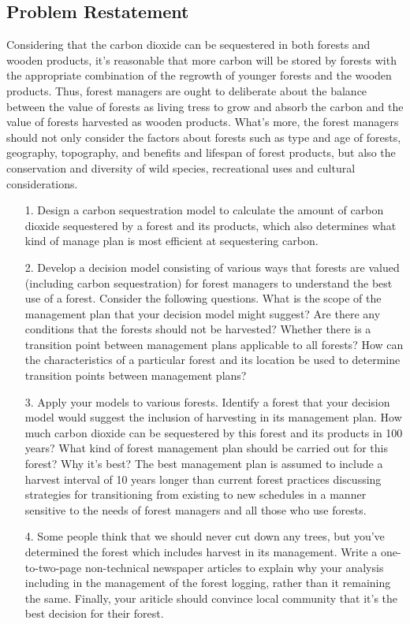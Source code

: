\documentclass{mcmthesis}
\numberwithin{figure}{section}
\numberwithin{table}{section}
\numberwithin{equation}{section}
\begin{document}
\subsection{Problem Restatement}
Considering that the carbon dioxide can be sequestered in both forests 
and wooden products, it's reasonable that more carbon will be stored by forests with the 
appropriate combination of the regrowth of younger forests and the wooden products.
Thus, forest managers are ought to deliberate about the balance between the value of forests 
as living tress to grow and absorb the carbon and the value of forests harvested as wooden products.
What's more, the forest managers should not only consider the factors about forests such as 
type and age of forests, geography, topography, and benefits and lifespan of forest products,
but also the conservation and diversity of wild species, recreational uses and cultural considerations.
\begin{enumerate}
    \item [1.] Design a carbon sequestration model to calculate the amount of carbon dioxide 
    sequestered by a forest and its products, which also determines what kind of manage plan is
    most efficient at sequestering carbon.
    \item [2.] Develop a decision model consisting of various ways that forests are valued (including
    carbon sequestration) for forest managers to understand the best use of a forest. Consider 
    the following questions. What is the scope of the management plan that your decision model might suggest?
    Are there any conditions that the forests should not be harvested?
    Whether there is a transition point between management plans applicable to all forests?
    How can the characteristics of a particular forest and its location be used 
    to determine transition points between management plans?
    \item [3.] Apply your models to various forests. Identify a forest that your decision model 
    would suggest the inclusion of harvesting in its management plan.
    How much carbon dioxide can be sequestered by this forest and its products in 100 years?
    What kind of forest management plan should be carried out for this forest? Why it's best?
    The best management plan is assumed to include a harvest interval of 10 
    years longer than current forest practices discussing strategies for transitioning 
    from existing to new schedules in a manner sensitive to the needs of forest managers 
    and all those who use forests.

    \item [4.] Some people think that we should never cut down any trees, but you've
    determined the forest which includes harvest in its management. Write a one-to-two-page
    non-technical newspaper articles to explain why your analysis including in the 
    management of the forest logging, rather than it remaining the same. Finally, your ariticle 
    should convince local community that it's the best decision for their forest.
\end{enumerate}
\end{document}
